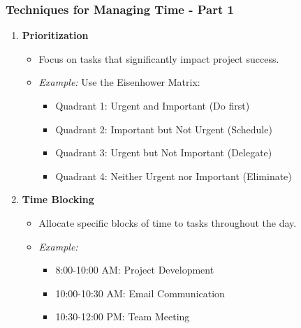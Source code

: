 \documentclass[aspectratio=169]{beamer}
\begin{document}
\begin{frame}[fragile]
    \frametitle{Techniques for Managing Time - Part 1}
    \begin{enumerate}
        \item \textbf{Prioritization}
            \begin{itemize}
                \item Focus on tasks that significantly impact project success.
                \item \textit{Example:} Use the Eisenhower Matrix:
                    \begin{itemize}
                        \item Quadrant 1: Urgent and Important (Do first)
                        \item Quadrant 2: Important but Not Urgent (Schedule)
                        \item Quadrant 3: Urgent but Not Important (Delegate)
                        \item Quadrant 4: Neither Urgent nor Important (Eliminate)
                    \end{itemize}
            \end{itemize}
        
        \item \textbf{Time Blocking}
            \begin{itemize}
                \item Allocate specific blocks of time to tasks throughout the day.
                \item \textit{Example:}
                    \begin{itemize}
                        \item 8:00-10:00 AM: Project Development
                        \item 10:00-10:30 AM: Email Communication
                        \item 10:30-12:00 PM: Team Meeting
                    \end{itemize}
            \end{itemize}
    \end{enumerate}
\end{frame}
\end{document}

